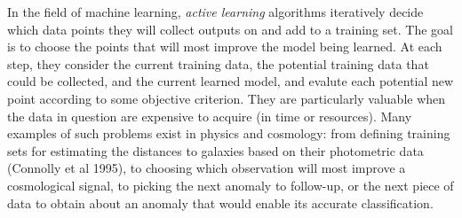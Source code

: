 \documentclass[useAMS,usenatbib,tightenlines,11pt,preprint]{aastex}
\begin{document}
In the field of machine learning, {\it active learning} algorithms
iteratively decide which data points they will collect outputs on and
add to a training set.  The goal is to choose the points that will
most improve the model being learned.  At each step, they consider the
current training data, the potential training data that could be
collected, and the current learned model, and evalute each potential
new point according to some objective criterion.  They are
particularly valuable when the data in question are expensive to
acquire (in time or resources). Many examples of such problems exist
in physics and cosmology: from defining training sets for estimating
the distances to galaxies based on their photometric data (Connolly et
al 1995), to choosing which observation will most improve a
cosmological signal, to picking the next anomaly to follow-up, or the
next piece of data to obtain about an anomaly that would enable its
accurate classification.



\end{document}
